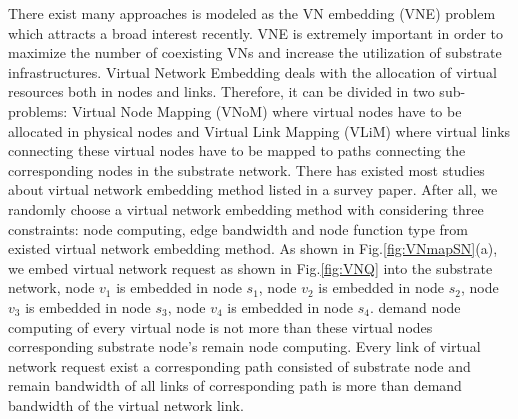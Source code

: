 There exist many approaches is modeled as the VN embedding (VNE) problem which attracts a broad interest recently\cite{fischer2013virtual}. VNE is extremely important in order to maximize the number of coexisting VNs and increase the utilization of substrate infrastructures. Virtual Network Embedding deals with the allocation of virtual resources both in nodes and links. Therefore, it can be divided in two sub-problems: Virtual Node Mapping (VNoM) where virtual nodes have to be allocated in physical nodes and Virtual Link Mapping (VLiM) where virtual links connecting these virtual nodes have to be mapped to paths connecting the
corresponding nodes in the substrate network. There has existed most studies about virtual network embedding method listed in a survey paper\cite{fischer2013virtual}. After all, we randomly choose a virtual network embedding method with considering three constraints: node computing, edge bandwidth and node function type from existed virtual network embedding method. As shown in Fig.\ref{fig:VNmapSN}(a), we embed virtual network request as shown in Fig.\ref{fig:VNQ} into the substrate network, node $v_1$ is embedded in node $s_1$, node $v_2$ is embedded in node $s_2$, node $v_3$ is embedded in node $s_3$, node $v_4$ is embedded in node $s_4$. demand node computing of every virtual node is not more than these virtual nodes corresponding substrate node's remain node computing. Every link of virtual network request exist a corresponding path consisted of substrate node and remain bandwidth of all links of corresponding path is more than demand  bandwidth of the virtual network link.


